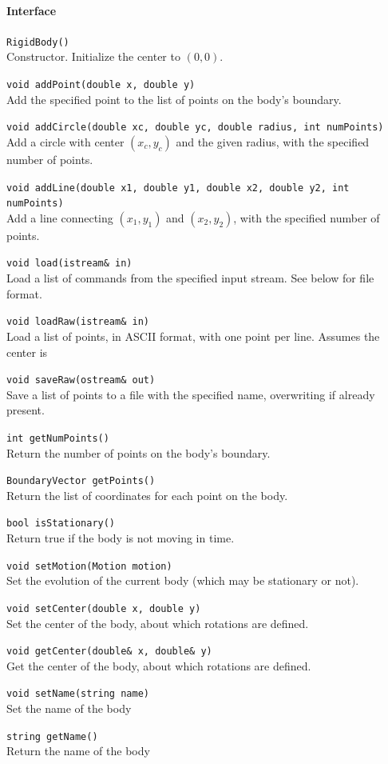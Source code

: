 \documentclass[11pt]{article}
\let\code\lstinline
\begin{document}
\paragraph{Interface}
\begin{description}
	\item \code|RigidBody()| \\
		Constructor.  Initialize the center to $(0,0)$.
	\item \code|void addPoint(double x, double y)| \\
		Add the specified point to the list of points on the body's boundary.
	\item \code|void addCircle(double xc, double yc, double radius, int numPoints)| \\
		Add a circle with center $(x_c,y_c)$ and the given radius, with the specified number of points.
	\item \code|void addLine(double x1, double y1, double x2, double y2, int numPoints)| \\
		Add a line connecting $(x_1,y_1)$ and $(x_2,y_2)$, with the specified number of points.
	\item \code|void load(istream& in)| \\
		Load a list of commands from the specified input stream.  See below for file format.
	\item \code|void loadRaw(istream& in)| \\
		Load a list of points, in ASCII format, with one point per line.  Assumes the center is 
	\item \code|void saveRaw(ostream& out)| \\
		Save a list of points to a file with the specified name, overwriting if already present.
	\item \code|int getNumPoints()| \\
		Return the number of points on the body's boundary.
	\item \code|BoundaryVector getPoints()| \\
		Return the list of coordinates for each point on the body.
	\item \code|bool isStationary()| \\
		Return true if the body is not moving in time.
	\item \code|void setMotion(Motion motion)| \\
		Set the evolution of the current body (which may be stationary or not).
	\item \code|void setCenter(double x, double y)| \\
		Set the center of the body, about which rotations are defined.
	\item \code|void getCenter(double& x, double& y)|\\
		Get the center of the body, about which rotations are defined.
	\item \code|void setName(string name)| \\
		Set the name of the body
	\item \code|string getName()| \\
		Return the name of the body
	\item 
\end{description}
\end{document}
